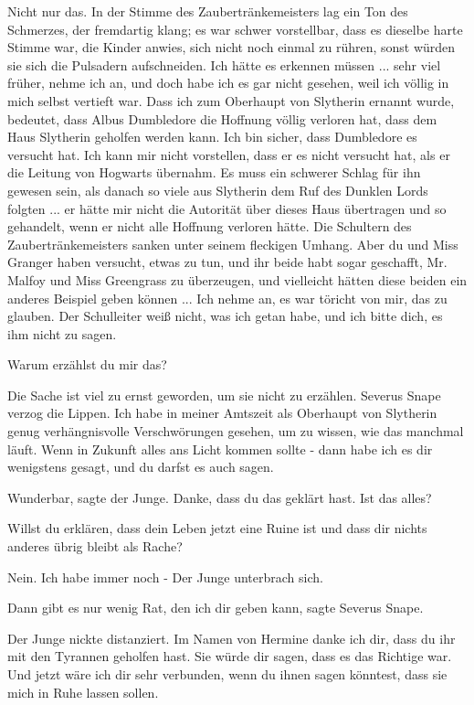 \glqq{}Nicht nur das.\grqq{} In der Stimme des Zaubertränkemeisters lag ein Ton
des Schmerzes, der fremdartig klang; es war schwer vorstellbar, dass es dieselbe
harte Stimme war, die Kinder anwies, sich nicht noch einmal zu rühren, sonst
würden sie sich die Pulsadern aufschneiden. \glqq{}Ich hätte es erkennen müssen
... sehr viel früher, nehme ich an, und doch habe ich es gar nicht gesehen, weil
ich völlig in mich selbst vertieft war. Dass ich zum Oberhaupt von Slytherin
ernannt wurde, bedeutet, dass Albus Dumbledore die Hoffnung völlig verloren hat,
dass dem Haus Slytherin geholfen werden kann. Ich bin sicher, dass Dumbledore es
versucht hat. Ich kann mir nicht vorstellen, dass er es nicht versucht hat, als
er die Leitung von Hogwarts übernahm. Es muss ein schwerer Schlag für ihn
gewesen sein, als danach so viele aus Slytherin dem Ruf des Dunklen Lords
folgten ... er hätte mir nicht die Autorität über dieses Haus übertragen und so
gehandelt, wenn er nicht alle Hoffnung verloren hätte.\grqq{} Die Schultern des
Zaubertränkemeisters sanken unter seinem fleckigen Umhang. \glqq{}Aber du und
Miss Granger haben versucht, etwas zu tun, und ihr beide habt sogar geschafft,
Mr. Malfoy und Miss Greengrass zu überzeugen, und vielleicht hätten diese beiden
ein anderes Beispiel geben können ... Ich nehme an, es war töricht von mir, das
zu glauben. Der Schulleiter weiß nicht, was ich getan habe, und ich bitte dich,
es ihm nicht zu sagen.\grqq{}

\glqq{}Warum erzählst du mir das?\grqq{}

\glqq{}Die Sache ist viel zu ernst geworden, um sie nicht zu erzählen.\grqq{}
Severus Snape verzog die Lippen. \glqq{}Ich habe in meiner Amtszeit als Oberhaupt
von Slytherin genug verhängnisvolle Verschwörungen gesehen, um zu wissen, wie
das manchmal läuft. Wenn in Zukunft alles ans Licht kommen sollte - dann habe
ich es dir wenigstens gesagt, und du darfst es auch sagen.\grqq{}

\glqq{}Wunderbar\grqq{}, sagte der Junge. \glqq{}Danke, dass du das geklärt hast.
Ist das alles?\grqq{}

\glqq{}Willst du erklären, dass dein Leben jetzt eine Ruine ist und dass dir
nichts anderes übrig bleibt als Rache?\grqq{}

\glqq{}Nein. Ich habe immer noch -\grqq{} Der Junge unterbrach sich.

\glqq{}Dann gibt es nur wenig Rat, den ich dir geben kann\grqq{}, sagte Severus
Snape.

Der Junge nickte distanziert. \glqq{}Im Namen von Hermine danke ich dir, dass du
ihr mit den Tyrannen geholfen hast. Sie würde dir sagen, dass es das Richtige
war. Und jetzt wäre ich dir sehr verbunden, wenn du ihnen sagen könntest, dass
sie mich in Ruhe lassen sollen.\grqq{}

